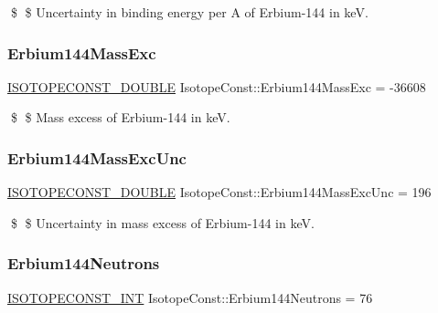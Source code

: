 \$ \$ Uncertainty in binding energy per A of Erbium-\/144 in keV. \mbox{\label{group___isotope_const-_erbium-_er144_ga315bd1e8ba6d91b52541673f7e6683e9}} 
\subsubsection{\texorpdfstring{Erbium144\+Mass\+Exc}{Erbium144MassExc}}
{\footnotesize\ttfamily \mbox{\hyperlink{group___isotope_const-_macros_ga8f45a7272ce02c0b4c65c44636ed719a}{I\+S\+O\+T\+O\+P\+E\+C\+O\+N\+S\+T\+\_\+\+D\+O\+U\+B\+LE}} Isotope\+Const\+::\+Erbium144\+Mass\+Exc = -\/36608}

\$ \$ Mass excess of Erbium-\/144 in keV. \mbox{\label{group___isotope_const-_erbium-_er144_ga566f8dd6094456c9c7916aef6aca8386}} 
\subsubsection{\texorpdfstring{Erbium144\+Mass\+Exc\+Unc}{Erbium144MassExcUnc}}
{\footnotesize\ttfamily \mbox{\hyperlink{group___isotope_const-_macros_ga8f45a7272ce02c0b4c65c44636ed719a}{I\+S\+O\+T\+O\+P\+E\+C\+O\+N\+S\+T\+\_\+\+D\+O\+U\+B\+LE}} Isotope\+Const\+::\+Erbium144\+Mass\+Exc\+Unc = 196}

\$ \$ Uncertainty in mass excess of Erbium-\/144 in keV. \mbox{\label{group___isotope_const-_erbium-_er144_gaee7e6584ce831734280e20e845fe912f}} 
\subsubsection{\texorpdfstring{Erbium144\+Neutrons}{Erbium144Neutrons}}
{\footnotesize\ttfamily \mbox{\hyperlink{group___isotope_const-_macros_ga5f18360b3e99483a35c32d789e62621c}{I\+S\+O\+T\+O\+P\+E\+C\+O\+N\+S\+T\+\_\+\+I\+NT}} Isotope\+Const\+::\+Erbium144\+Neutrons = 76}


